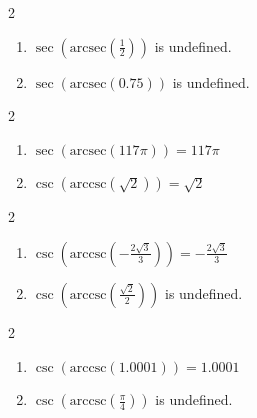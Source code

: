 \documentclass{ximera}
\begin{document}
\begin{multicols}{2}

\begin{enumerate}

\setcounter{enumi}{\value{HW}}

\item $\sec\left(\text{arcsec}\left(\frac{1}{2}\right)\right)$ is undefined.
\item $\sec\left(\text{arcsec}\left(0.75\right)\right)$ is undefined. 

\setcounter{HW}{\value{enumi}}

\end{enumerate}

\end{multicols}

\begin{multicols}{2}

\begin{enumerate}

\setcounter{enumi}{\value{HW}}

\item $\sec\left(\text{arcsec}\left( 117\pi \right)\right)= 117\pi $
\item $\csc\left(\text{arccsc}\left(\sqrt{2}\right)\right) = \sqrt{2}$ 

\setcounter{HW}{\value{enumi}}

\end{enumerate}

\end{multicols}

\begin{multicols}{2}

\begin{enumerate}

\setcounter{enumi}{\value{HW}}

\item $\csc\left(\text{arccsc}\left(-\frac{2\sqrt{3}}{3}\right)\right) = -\frac{2\sqrt{3}}{3}$
\item $\csc\left(\text{arccsc}\left(\frac{\sqrt{2}}{2}\right)\right)$ is undefined.

\setcounter{HW}{\value{enumi}}

\end{enumerate}

\end{multicols}

\begin{multicols}{2}

\begin{enumerate}

\setcounter{enumi}{\value{HW}}

\item $\csc\left(\text{arccsc}\left(1.0001\right)\right) = 1.0001$ 
\item $\csc\left(\text{arccsc}\left( \frac{\pi}{4} \right)\right)$ is undefined.

\setcounter{HW}{\value{enumi}}

\end{enumerate}

\end{multicols}
\end{document}
